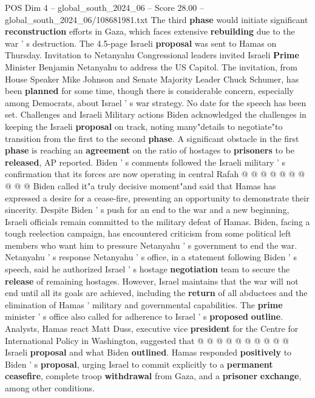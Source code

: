 \begin{textsample}{POS Dim 4 – global\_south\_2024\_06 – Score 28.00 – global\_south\_2024\_06/108681981.txt}
The third \textbf{phase} would initiate significant \textbf{reconstruction} efforts in Gaza, which faces extensive \textbf{rebuilding} due to the war ' s destruction.
The 4.5-page Israeli \textbf{proposal} was sent to Hamas on Thursday.
Invitation to Netanyahu Congressional leaders invited Israeli \textbf{Prime} Minister Benjamin Netanyahu to address the US Capitol.
The invitation, from House Speaker Mike Johnson and Senate Majority Leader Chuck Schumer, has been \textbf{planned} for some time, though there is considerable concern, especially among Democrats, about Israel ' s war strategy.
No date for the speech has been set.
Challenges and Israeli Military actions Biden acknowledged the challenges in keeping the Israeli \textbf{proposal} on track, noting many"details to negotiate"to transition from the first to the second \textbf{phase}.
A significant obstacle in the first \textbf{phase} is reaching an \textbf{agreement} on the ratio of hostages to \textbf{prisoners} to be \textbf{released}, AP reported.
Biden ' s comments followed the Israeli military ' s confirmation that its forces are now operating in central Rafah @ @ @ @ @ @ @ @ @ @ Biden called it"a truly decisive moment"and said that Hamas has expressed a desire for a cease-fire, presenting an opportunity to demonstrate their sincerity.
Despite Biden ' s push for an end to the war and a new beginning, Israeli officials remain committed to the military defeat of Hamas.
Biden, facing a tough reelection campaign, has encountered criticism from some political left members who want him to pressure Netanyahu ' s government to end the war.
Netanyahu ' s response Netanyahu ' s office, in a statement following Biden ' s speech, said he authorized Israel ' s hostage \textbf{negotiation} team to secure the \textbf{release} of remaining hostages.
However, Israel maintains that the war will not end until all its goals are achieved, including the \textbf{return} of all abductees and the elimination of Hamas ' military and governmental capabilities.
The \textbf{prime} minister ' s office also called for adherence to Israel ' s \textbf{proposed} \textbf{outline}.
Analysts, Hamas react Matt Duss, executive vice \textbf{president} for the Centre for International Policy in Washington, suggested that @ @ @ @ @ @ @ @ @ @ Israeli \textbf{proposal} and what Biden \textbf{outlined}.
Hamas responded \textbf{positively} to Biden ' s \textbf{proposal}, urging Israel to commit explicitly to a \textbf{permanent} \textbf{ceasefire}, complete troop \textbf{withdrawal} from Gaza, and a \textbf{prisoner} \textbf{exchange}, among other conditions.

\end{textsample}

